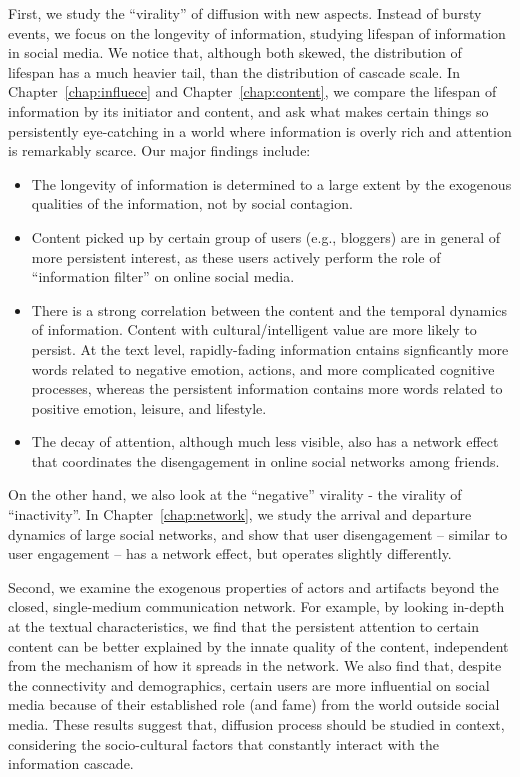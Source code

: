 \documentclass[phd,tocprelim]{cornell}
\begin{document}
First, we study the ``virality'' of diffusion with new aspects. Instead of bursty events, we focus on the longevity of information, studying lifespan of information in social media. We notice that, although both skewed, the distribution of lifespan has a much heavier tail, than the distribution of cascade scale.  
In Chapter~\ref{chap:influece} and Chapter~\ref{chap:content}, we compare the lifespan of information by its initiator and content, and ask what makes certain things so persistently eye-catching in a world where information is overly rich and attention is remarkably scarce\cite{Simon-1971}. Our major findings include:
\begin{itemize}
\item The longevity of information is determined to a large extent by the exogenous qualities of the information, not by social contagion. 
\item Content picked up by certain group of users (e.g., bloggers) are in general of more persistent interest, as these users actively perform the role of ``information filter'' on online social media.
\item There is a strong correlation between the content and the temporal dynamics of information. Content with cultural/intelligent value are more likely to persist. At the text level, rapidly-fading information cntains signficantly more words related to negative emotion, actions, and more complicated cognitive processes, whereas the persistent information contains more words related to positive emotion, leisure, and lifestyle.
\item The decay of attention, although much less visible, also has a network effect that coordinates the disengagement in online social networks among friends.
\end{itemize}

On the other hand, we also look at the ``negative'' virality - the virality of ``inactivity''. In Chapter~\ref{chap:network}, we study the arrival and departure dynamics of large social networks, and show that user disengagement -- similar to user engagement -- has a network effect, but operates slightly differently.

Second, we examine the exogenous properties of actors and artifacts beyond the closed, single-medium communication network. For example, by looking in-depth at the textual characteristics, we find that the persistent attention to certain content can be better explained by the innate quality of the content, independent from the mechanism of how it spreads in the network. We also find that, despite the connectivity and demographics, certain users are more influential on social media because of their established role (and fame) from the world outside social media. These results suggest that, diffusion process should be studied in context, considering the socio-cultural factors that constantly interact with the information cascade.
\end{document}
